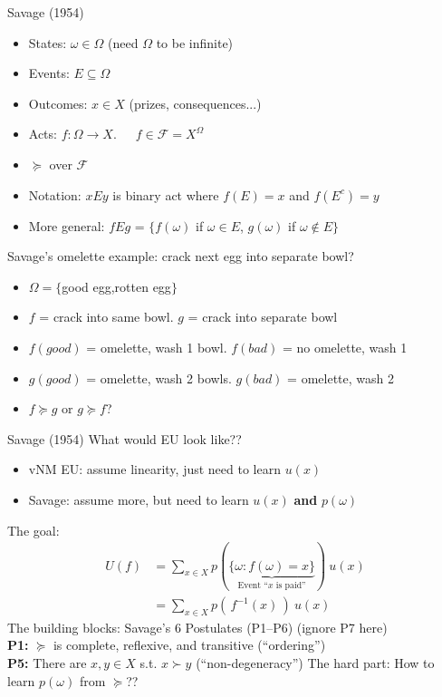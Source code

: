 \begin{frame}{Savage (1954)}
\begin{itemize}
    \item States: $\omega\in \Omega$ (need $\Omega$ to be infinite)
    \item Events: $E\subseteq \Omega$
    \item Outcomes: $x\in X$ (prizes, consequences...)
    \item Acts: $f:\Omega \rightarrow X$.\ \ \ $f\in \mathcal{F} = X^\Omega$
    \item $\succeq$ over $\mathcal{F}$
    \item Notation: $xEy$ is binary act where $f(E)=x$ and $f(E^c)=y$
    \item More general: $fEg$ = $\{f(\omega)$ if $\omega\in E$, $g(\omega)$ if $\omega\not\in E\}$
\end{itemize}
Savage's omelette example: crack next egg into separate bowl?
\begin{itemize}
    \item $\Omega = \{$good egg,rotten egg$\}$
    \item $f$ = crack into same bowl. $g$ = crack into separate bowl
    \item $f(good)$ = omelette, wash 1 bowl. $f(bad)$ = no omelette, wash 1
    \item $g(good)$ = omelette, wash 2 bowls. $g(bad)$ = omelette, wash 2
    \item $f\succeq g$ or $g\succeq f$?
\end{itemize}
\end{frame}

\begin{frame}{Savage (1954)}
What would EU look like??
\begin{itemize}
    \item vNM EU: assume linearity, just need to learn $u(x)$
    \item Savage: assume more, but need to learn $u(x)$ \textbf{and} $p(\omega)$
\end{itemize}
\br
The goal:
\begin{align*}
    U(f) &= \sum_{x\in X} p(\underbrace{\{\omega: f(\omega)=x\}}_{\text{Event ``}x\text{ is paid''}})\ u(x)\\
         &= \sum_{x\in X} p(\, f^{-1}(x)\, )\ u(x)
\end{align*}
The building blocks: Savage's 6 Postulates (P1--P6) (ignore P7 here)\\
\textbf{P1:} $\succeq$ is complete, reflexive, and transitive (``ordering'')\\
\textbf{P5:} There are $x,y\in X$ s.t. $x\succ y$ (``non-degeneracy'')
\br
The hard part: How to learn $p(\omega)$ from $\succeq$??
\end{frame}

